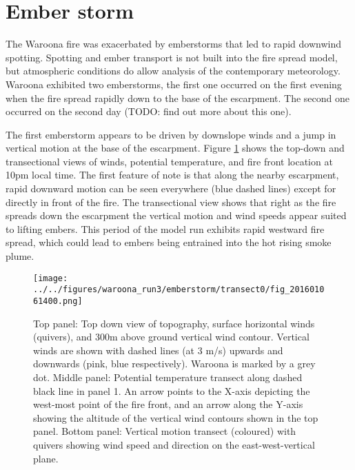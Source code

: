 \section{Ember storm}
  \label{emberstorm}

  The Waroona fire was exacerbated by emberstorms that led to rapid downwind spotting.
  Spotting and ember transport is not built into the fire spread model, but atmospheric conditions do allow analysis of the contemporary meteorology.
  Waroona exhibited two emberstorms, the first one occurred on the first evening when the fire spread rapidly down to the base of the escarpment.
  The second one occurred on the second day (TODO: find out more about this one).
  
  The first emberstorm appears to be driven by downslope winds and a jump in vertical motion at the base of the escarpment.
  Figure \ref{fig:emberstorm:jump} shows the top-down and transectional views of winds, potential temperature, and fire front location at 10pm local time.
  The first feature of note is that along the nearby escarpment, rapid downward motion can be seen everywhere (blue dashed lines) except for directly in front of the fire.
  The transectional view shows that right as the fire spreads down the escarpment the vertical motion and wind speeds appear suited to lifting embers.
  This period of the model run exhibits rapid westward fire spread, which could lead to embers being entrained into the hot rising smoke plume.
  \begin{figure}
    \texttt{[image: ../../figures/waroona\_run3/emberstorm/transect0/fig\_201601061400.png]}
    \caption{%
      Top panel: Top down view of topography, surface horizontal winds (quivers), and 300m above ground vertical wind contour. Vertical winds are shown with dashed lines (at 3 m/s) upwards and downwards (pink, blue respectively). 
      Waroona is marked by a grey dot.
      Middle panel: Potential temperature transect along dashed black line in panel 1. An arrow points to the X-axis depicting the west-most point of the fire front, and an arrow along the Y-axis showing the altitude of the vertical wind contours shown in the top panel.
      Bottom panel: Vertical motion transect (coloured) with quivers showing wind speed and direction on the east-west-vertical plane.}
    \label{fig:emberstorm:jump}
  \end{figure}